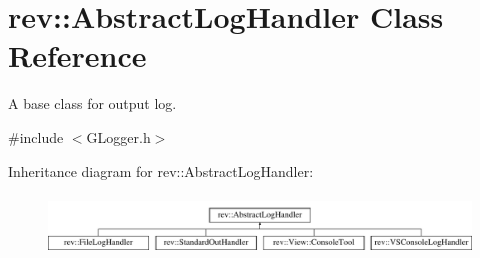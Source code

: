 \hypertarget{classrev_1_1_abstract_log_handler}{}\section{rev\+::Abstract\+Log\+Handler Class Reference}
\label{classrev_1_1_abstract_log_handler}


A base class for output log.  




{\ttfamily \#include $<$G\+Logger.\+h$>$}

Inheritance diagram for rev\+::Abstract\+Log\+Handler\+:\begin{figure}[H]
\begin{center}
\leavevmode
\includegraphics[height=1.609195cm]{classrev_1_1_abstract_log_handler}
\end{center}
\end{figure}
